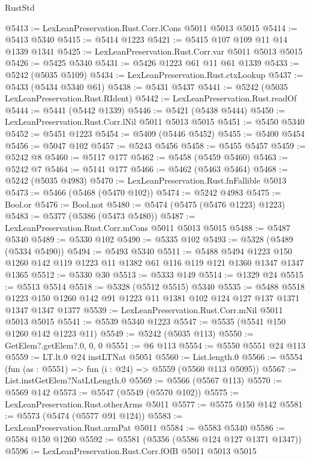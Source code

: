 \begin{lexlean}{RustStd}
\begin{coremodule}
@5413 := LexLeanPreservation.Rust.Corr.lCons @5011 @5013 @5015
@5414 := @5413 @5340
@5415 := @5414 @1223
@5421 := @5415 @107 @109 @11 @14 @1339 @1341
@5425 := LexLeanPreservation.Rust.Corr.var @5011 @5013 @5015
@5426 := @5425 @5340
@5431 := @5426 @1223 @61 @11 @61 @1339
@5433 := @5242 (@5035 @5109)
@5434 := LexLeanPreservation.Rust.ctxLookup
@5437 := @5433 (@5434 @5340 @61)
@5438 := @5431 @5437
@5441 := @5242 (@5035 LexLeanPreservation.Rust.RIdent)
@5442 := LexLeanPreservation.Rust.readOf
@5444 := @5441 (@5442 @1339)
@5446 := @5421 (@5438 @5444)
@5450 := LexLeanPreservation.Rust.Corr.lNil @5011 @5013 @5015
@5451 := @5450 @5340
@5452 := @5451 @1223
@5454 := @5409 (@5446 @5452)
@5455 := @5400 @5454
@5456 := @5047 @102
@5457 := @5243 @5456
@5458 := @5455 @5457
@5459 := @5242 @8
@5460 := @5117 @177
@5462 := @5458 (@5459 @5460)
@5463 := @5242 @7
@5464 := @5141 @177
@5466 := @5462 (@5463 @5464)
@5468 := @5242 (@5035 @4983)
@5470 := LexLeanPreservation.Rust.fnFallible @5013
@5473 := @5466 (@5468 (@5470 @102))
@5474 := @5242 @4983
@5475 := Bool.or
@5476 := Bool.not
@5480 := @5474 (@5475 (@5476 @1223) @1223)
@5483 := @5377 (@5386 (@5473 @5480))
@5487 := LexLeanPreservation.Rust.Corr.mCons @5011 @5013 @5015
@5488 := @5487 @5340
@5489 := @5330 @102
@5490 := @5335 @102
@5493 := @5328 (@5489 (@5334 @5490))
@5494 := @5493 @5340
@5511 := @5488
    @5494
    @1223
    @150
    @1260
    @142
    @119
    @1223
    @11
    @1382
    @61
    @116
    @119
    @121
    @1360
    @1347
    @1347
    @1365
@5512 := @5330 @30
@5513 := @5333 @149
@5514 := @1329 @24
@5515 := @5513 @5514
@5518 := @5328 (@5512 @5515) @5340
@5535 := @5488
    @5518
    @1223
    @150
    @1260
    @142
    @91
    @1223
    @11
    @1381
    @102
    @124
    @127
    @137
    @1371
    @1347
    @1347
    @1377
@5539 := LexLeanPreservation.Rust.Corr.mNil @5011 @5013 @5015
@5541 := @5539 @5340 @1223
@5547 := @5535 (@5541 @150 @1260 @142 @1223 @11)
@5549 := @5242 (@5035 @113)
@5550 := GetElem?.getElem?.{0, 0, 0}
@5551 := @6 @113
@5554 := @5550 @5551 @24 @113
@5559 := LT.lt.{0} @24 instLTNat @5051
@5560 := List.length.{0}
@5566 := @5554 (fun (as : @5551) => fun (i : @24) => @5559 (@5560 @113 @5095))
@5567 := List.instGetElem?NatLtLength.{0}
@5569 := @5566 (@5567 @113)
@5570 := @5569 @142
@5573 := @5547 (@5549 (@5570 @102))
@5575 := LexLeanPreservation.Rust.otherArms @5011
@5577 := @5575 @150 @142
@5581 := @5573 (@5474 (@5577 @91 @124))
@5583 := LexLeanPreservation.Rust.armPat @5011
@5584 := @5583 @5340
@5586 := @5584 @150 @1260
@5592 := @5581 (@5356 (@5586 @124 @127 @1371 @1347))
@5596 := LexLeanPreservation.Rust.Corr.fOfB @5011 @5013 @5015

\end{coremodule}
\end{lexlean}
